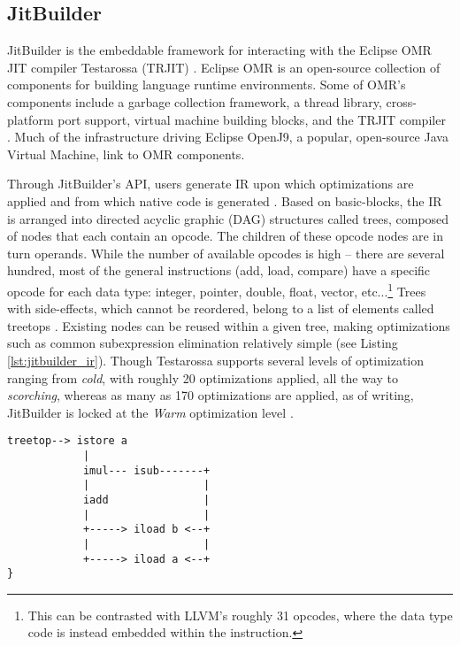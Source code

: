 \subsection{JitBuilder}
\label{sec:jitbuilder}
JitBuilder is the embeddable framework for interacting with the Eclipse OMR JIT compiler Testarossa (TRJIT) \cite{jitbuilderPaper}.
Eclipse OMR is an open-source collection of components for building language runtime environments.
Some of OMR's components include a garbage collection framework, a thread library, cross-platform port support, virtual machine building blocks, and the TRJIT compiler \cite{eclipseOMR,RebuildingAirliner}.
Much of the infrastructure driving Eclipse OpenJ9, a popular, open-source Java Virtual Machine, link to OMR components.

Through JitBuilder's API, users generate IR upon which optimizations are applied and from which native code is generated \cite{SuganumaIBMJit}.
Based on basic-blocks, the IR is arranged into directed acyclic graphic (DAG) structures called trees, composed of nodes that each contain an opcode.
The children of these opcode nodes are in turn operands.
While the number of available opcodes is high -- there are several hundred, most of the general instructions (add, load, compare) have a specific opcode for each data type: integer, pointer, double, float, vector, etc...\footnote{
    This can be contrasted with LLVM's roughly 31 opcodes, where the data type code is instead embedded within the instruction.
}
Trees with side-effects, which cannot be reordered, belong to a list of elements called treetops \cite{treetops}.
Existing nodes can be reused within a given tree, making optimizations such as common subexpression elimination relatively simple (see Listing \ref{lst:jitbuilder_ir}).
Though Testarossa supports several levels of optimization ranging from \textit{cold}, with roughly 20 optimizations applied, all the way to \textit{scorching}, whereas as many as 170 optimizations are applied, as of writing, JitBuilder is locked at the \textit{Warm} optimization level \cite{sanchez2011using, jitbuilderWarm}.
\begin{lstlisting}[float,floatplacement=H,
caption={OMR IR representation for (a+b)*(a-b). Note that the iload nodes are reused \cite{treetops}.},
label=lst:jitbuilder_ir]
treetop--> istore a
            |
            imul--- isub-------+
            |                  |
            iadd               |
            |                  |
            +-----> iload b <--+
            |                  |
            +-----> iload a <--+
}\end{lstlisting}

